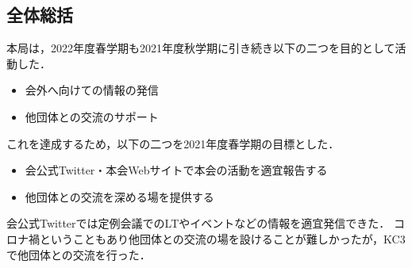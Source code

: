 \subsection*{全体総括}


本局は，2022年度春学期も2021年度秋学期に引き続き以下の二つを目的として活動した．
\begin{itemize}
\item 会外へ向けての情報の発信
\item 他団体との交流のサポート
\end{itemize}
これを達成するため，以下の二つを2021年度春学期の目標とした．
\begin{itemize}
\item 会公式Twitter・本会Webサイトで本会の活動を適宜報告する
\item 他団体との交流を深める場を提供する
\end{itemize}

会公式Twitterでは定例会議でのLTやイベントなどの情報を適宜発信できた．
コロナ禍ということもあり他団体との交流の場を設けることが難しかったが，KC3で他団体との交流を行った．

